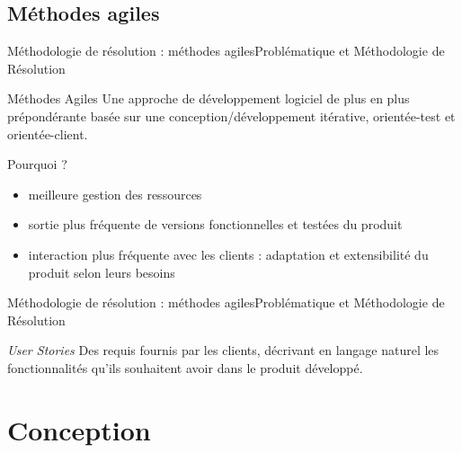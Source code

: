 \documentclass{beamer}
\begin{document}
\subsection{Méthodes agiles}
\begin{frame}{Méthodologie de résolution : méthodes agiles}{Problématique et Méthodologie de Résolution}
\begin{block}{Méthodes Agiles}
Une approche de développement logiciel de plus en plus prépondérante basée sur une conception/développement itérative, orientée-test et orientée-client.
\end{block}

\begin{block}{Pourquoi ?}
\begin{itemize}
  \item meilleure gestion des ressources
  \item sortie plus fréquente de versions fonctionnelles et testées du produit
  \item interaction plus fréquente avec les clients : adaptation et extensibilité du produit selon leurs besoins
\end{itemize}
\end{block}
\end{frame}

\begin{frame}{Méthodologie de résolution : méthodes agiles}{Problématique et Méthodologie de Résolution}
\begin{block}{\textit{User Stories}}
Des requis fournis par les clients, décrivant en langage naturel les fonctionnalités qu'ils souhaitent avoir dans le produit développé.
\end{block}
\end{frame}
\section{Conception}
\end{document}
